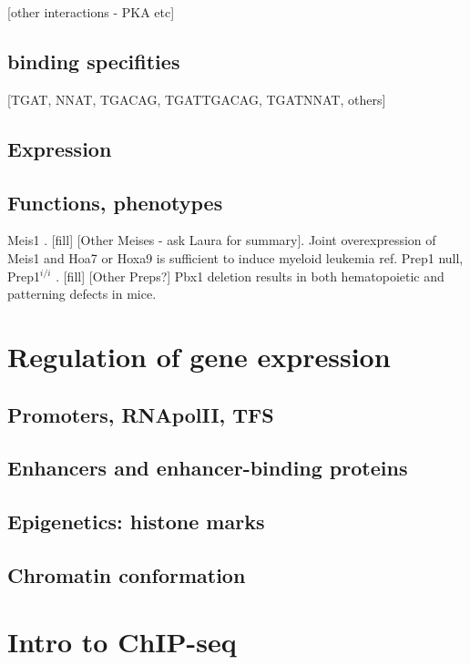 		[other interactions - PKA etc]

\subsection{binding specifities}
		
		
		
		[TGAT, NNAT, TGACAG, TGATTGACAG, TGATNNAT, others]

\subsection{Expression}
\subsection{Functions, phenotypes}

		Meis1  \cite{Azcoitia2005, Carramolino2010}. [fill] [Other Meises - ask Laura for summary]. Joint overexpression of Meis1 and Hoa7 or Hoxa9 is sufficient to induce myeloid leukemia {ref}.
		Prep1 null, Prep1$^{i/i}$ \cite{Ferretti2006, Fernandez-Diaz2010, Longobardi2010}. [fill] [Other Preps?]
		Pbx1 deletion results in both hematopoietic \cite{DiMartino2001} and patterning \cite{Selleri et al. 2001} defects in mice.

\section{Regulation of gene expression}

\subsection{Promoters, RNApolII, TFS}

\subsection{Enhancers and enhancer-binding proteins}

\subsection{Epigenetics: histone marks}

\subsection{Chromatin conformation}

\section{Intro to ChIP-seq}

